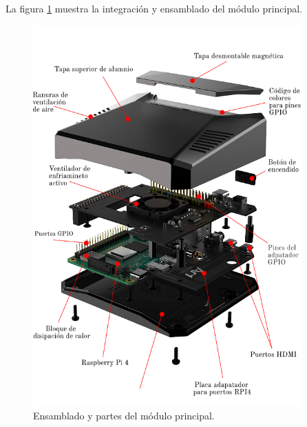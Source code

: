La figura \ref{fig:argon} muestra la integración y ensamblado del módulo principal.

\begin{figure}[htpb]
\centering 
\includegraphics[width=0.92\textwidth]{./Figures/armadoactuador.png}
\caption{Ensamblado y partes del módulo principal. }
\label{fig:argon}
\end{figure}








